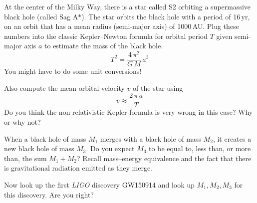 \documentclass[12pt, letterpaper]{article}
\begin{document}
\begin{problem}
At the center of the Milky Way, there is a star called {\small S2}
orbiting a supermassive black hole (called Sag A$\ast$).
The star orbits the black hole with a period of 16\,yr, on an orbit
that has a mean radius (semi-major axis) of 1000\,AU.
Plug these numbers into the classic Kepler--Newton formula for orbital
period $T$ given semi-major axis $a$ to estimate the mass of the black
hole.
\begin{equation}
T^2 = \frac{4\,\pi^2}{G\,M}\,a^3
\end{equation}
You might have to do some unit conversions!

Also compute the mean orbital velocity $v$ of the star using
\begin{equation}
v \approx \frac{2\,\pi\,a}{T}
\end{equation}
Do you think the non-relativistic Kepler formula is very wrong in this
case? Why or why not?
\end{problem}

\begin{problem}
When a black hole of mass $M_1$ merges with a black hole of mass $M_2$,
it creates a new black hole of mass $M_3$. Do you expect $M_3$ to be
equal to, less than, or more than, the sum $M_1 + M_2$? Recall mass--energy
equivalence and the fact that there is gravitational radiation emitted as
they merge.

Now look up the first \textsl{\small LIGO} discovery {\small GW150914} and
look up $M_1, M_2, M_3$ for this discovery. Are you right?
\end{problem}
\end{document}
